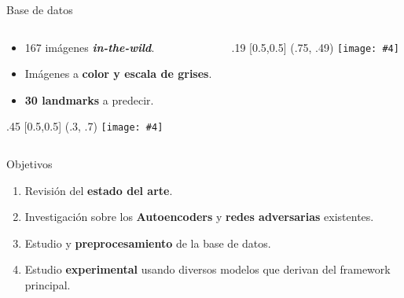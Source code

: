 \documentclass[aspectratio=43]{beamer}
\renewcommand{\cite}[1]{\footnote<.->[frame]{\fullcite{#1}}}
\newcommand{\absimage}[4][0.5,0.5]{%
	\begin{textblock}{#3}%
		[#1]%
		(#2)%
		\texttt{[image: \#4]}%
\end{textblock}}
\begin{document}

\begin{frame}[t]{Base de datos}
  \begin{columns}[onlytextwidth]
    \begin{column}{.5\textwidth}
      \begin{itemize}
        \item 167 imágenes \textbf{\textit{in-the-wild}}.
        \item Imágenes a \textbf{color y escala de grises}.
        \item \textbf{30 landmarks} a predecir.
      \end{itemize}  
      \absimage{.3, .7}{.45}{imgs/EjemplosBD.png}
    \end{column}
    \begin{column}{.5\textwidth}
      \absimage{.75, .49}{.19}{imgs/vertical.png}
    \end{column}
  \end{columns}
\end{frame}


\begin{frame}{Objetivos}
  \begin{enumerate}
    \item Revisión del \textbf{estado del arte}.
    \item Investigación sobre los \textbf{Autoencoders} y \textbf{redes adversarias} existentes.
    \item Estudio y \textbf{preprocesamiento} de la base de datos.
    \item Estudio \textbf{experimental} usando diversos modelos que derivan del framework principal.
  \end{enumerate}
\end{frame}
\end{document}
